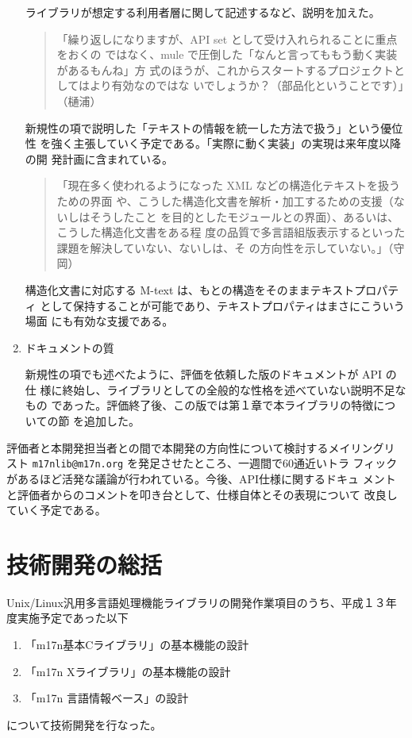 \begin{enumerate}
ライブラリが想定する利用者層に関して記述するなど、説明を加えた。

\begin{quote}
「繰り返しになりますが、API set として受け入れられることに重点をおくの
ではなく、mule で圧倒した「なんと言ってももう動く実装があるもんね」方
式のほうが、これからスタートするプロジェクトとしてはより有効なのではな
いでしょうか？（部品化ということです）」（樋浦）
\end{quote}

新規性の項で説明した「テキストの情報を統一した方法で扱う」という優位性
を強く主張していく予定である。「実際に動く実装」の実現は来年度以降の開
発計画に含まれている。

\begin{quote}
「現在多く使われるようになった XML などの構造化テキストを扱うための界面
や、こうした構造化文書を解析・加工するための支援（ないしはそうしたこと
を目的としたモジュールとの界面）、あるいは、こうした構造化文書をある程
度の品質で多言語組版表示するといった課題を解決していない、ないしは、そ
の方向性を示していない。」（守岡）
\end{quote}

構造化文書に対応する M-text は、もとの構造をそのままテキストプロパティ
として保持することが可能であり、テキストプロパティはまさにこういう場面
にも有効な支援である。

\item ドキュメントの質

新規性の項でも述べたように、評価を依頼した版のドキュメントが API の仕
様に終始し、ライブラリとしての全般的な性格を述べていない説明不足なもの
であった。評価終了後、この版では第１章で本ライブラリの特徴についての節
を追加した。

\end{enumerate}

評価者と本開発担当者との間で本開発の方向性について検討するメイリングリ
スト {\tt m17nlib@m17n.org} を発足させたところ、一週間で60通近いトラ
フィックがあるほど活発な議論が行われている。今後、API仕様に関するドキュ
メントと評価者からのコメントを叩き台として、仕様自体とその表現について
改良していく予定である。

\section{技術開発の総括}

Unix/Linux汎用多言語処理機能ライブラリの開発作業項目のうち、平成１３年
度実施予定であった以下
\begin{enumerate}
\item 「m17n基本Cライブラリ」の基本機能の設計
\item 「m17n Xライブラリ」の基本機能の設計 
\item 「m17n 言語情報ベース」の設計
\end{enumerate}
について技術開発を行なった。

